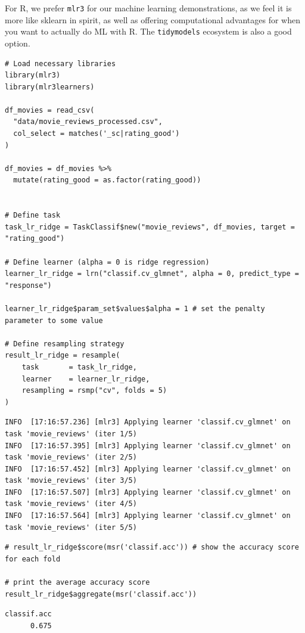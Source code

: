\documentclass[
  letterpaper,
]{krantz}
\begin{document}
For R, we prefer \texttt{mlr3} for our machine learning demonstrations,
as we feel it is more like sklearn in spirit, as well as offering
computational advantages for when you want to actually do ML with R. The
\texttt{tidymodels} ecosystem is also a good option.

\begin{verbatim}
# Load necessary libraries
library(mlr3)
library(mlr3learners)

df_movies = read_csv(
  "data/movie_reviews_processed.csv", 
  col_select = matches('_sc|rating_good')
)

df_movies = df_movies %>% 
  mutate(rating_good = as.factor(rating_good))


# Define task
task_lr_ridge = TaskClassif$new("movie_reviews", df_movies, target = "rating_good")

# Define learner (alpha = 0 is ridge regression)
learner_lr_ridge = lrn("classif.cv_glmnet", alpha = 0, predict_type = "response")

learner_lr_ridge$param_set$values$alpha = 1 # set the penalty parameter to some value

# Define resampling strategy
result_lr_ridge = resample(
    task       = task_lr_ridge,
    learner    = learner_lr_ridge,
    resampling = rsmp("cv", folds = 5)
)
\end{verbatim}

\begin{verbatim}
INFO  [17:16:57.236] [mlr3] Applying learner 'classif.cv_glmnet' on task 'movie_reviews' (iter 1/5)
INFO  [17:16:57.395] [mlr3] Applying learner 'classif.cv_glmnet' on task 'movie_reviews' (iter 2/5)
INFO  [17:16:57.452] [mlr3] Applying learner 'classif.cv_glmnet' on task 'movie_reviews' (iter 3/5)
INFO  [17:16:57.507] [mlr3] Applying learner 'classif.cv_glmnet' on task 'movie_reviews' (iter 4/5)
INFO  [17:16:57.564] [mlr3] Applying learner 'classif.cv_glmnet' on task 'movie_reviews' (iter 5/5)
\end{verbatim}

\begin{verbatim}
# result_lr_ridge$score(msr('classif.acc')) # show the accuracy score for each fold

# print the average accuracy score
result_lr_ridge$aggregate(msr('classif.acc'))
\end{verbatim}

\begin{verbatim}
classif.acc 
      0.675 
\end{verbatim}
\end{document}
